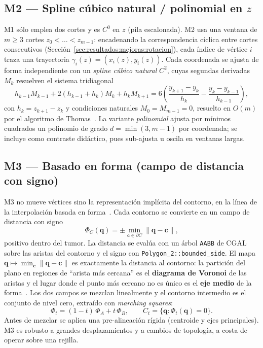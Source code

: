 \documentclass[conference]{IEEEtran}
\begin{document}
\subsection{M2 --- Spline cúbico natural / polinomial en $z$}
\label{sec:m2}
M1 sólo emplea dos cortes y es $C^0$ en $z$ (pila escalonada). M2 usa una
ventana de $m\!\ge\!3$ cortes $z_0<\dots<z_{m-1}$: encadenando la
correspondencia cíclica entre cortes consecutivos
(Sección~\ref{sec:resultados:mejoras:rotacion}), cada índice de vértice
$i$ traza una trayectoria $\gamma_i(z)=(x_i(z),y_i(z))$. Cada coordenada se
ajusta de forma independiente con un \emph{spline cúbico natural} $C^2$,
cuyas segundas derivadas $M_k$ resuelven el sistema tridiagonal
\begin{equation}
  h_{k-1}M_{k-1}+2(h_{k-1}+h_k)M_k+h_kM_{k+1}
  = 6\!\left(\frac{y_{k+1}-y_k}{h_k}-\frac{y_k-y_{k-1}}{h_{k-1}}\right),
\end{equation}
con $h_k=z_{k+1}-z_k$ y condiciones naturales $M_0=M_{m-1}=0$, resuelto en
$O(m)$ por el algoritmo de Thomas~\cite{herman1992}. La variante
\emph{polinomial} ajusta por mínimos cuadrados un polinomio de grado
$d=\min(3,m-1)$ por coordenada; se incluye como contraste didáctico, pues
sub-ajusta u oscila en ventanas largas.

\subsection{M3 --- Basado en forma (campo de distancia con signo)}
\label{sec:m3}
M3 no mueve vértices sino la representación implícita del contorno, en la
línea de la interpolación basada en forma~\cite{rayaudupa1990}. Cada
contorno se convierte en un campo de distancia con signo
\begin{equation}
  \Phi_C(\mathbf q)=\pm\min_{\mathbf c\in\partial C}
  \lVert\mathbf q-\mathbf c\rVert,
\end{equation}
positivo dentro del tumor. La distancia se evalúa con un árbol
\texttt{AABB} de CGAL sobre las aristas del contorno y el signo con
\texttt{Polygon\_2::bounded\_side}. El mapa
$\mathbf q\mapsto\min_{\mathbf c}\lVert\mathbf q-\mathbf c\rVert$ es
exactamente la distancia al contorno: la partición del plano en regiones
de ``arista más cercana'' es el \textbf{diagrama de Voronoi} de las
aristas y el lugar donde el punto más cercano no es único es el
\textbf{eje medio} de la forma~\cite{blum1967}. Los dos campos se
mezclan linealmente y el contorno intermedio es el conjunto de nivel cero,
extraído con \emph{marching squares}:
\begin{equation}
  \Phi_t=(1-t)\,\Phi_A+t\,\Phi_B,
  \qquad C_t=\{\mathbf q:\Phi_t(\mathbf q)=0\}.
\end{equation}
Antes de mezclar se aplica una pre-alineación rígida (centroide y ejes
principales). M3 es robusto a grandes desplazamientos y a cambios de
topología, a costa de operar sobre una rejilla.
\end{document}
